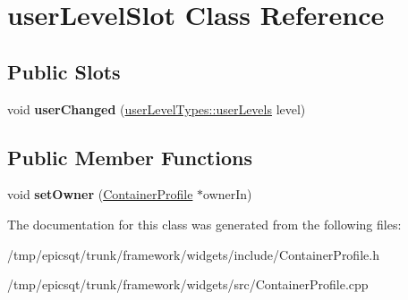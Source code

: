 \hypertarget{classuserLevelSlot}{
\section{userLevelSlot Class Reference}
\label{classuserLevelSlot}
}
\subsection*{Public Slots}
\begin{DoxyCompactItemize}
\item 
\hypertarget{classuserLevelSlot_af89803dcb509c62b15aa3c4f97d7492c}{
void {\bfseries userChanged} (\hyperlink{classuserLevelTypes_a033cf2a40f620286b1839dd360c8497b}{userLevelTypes::userLevels} level)}
\label{classuserLevelSlot_af89803dcb509c62b15aa3c4f97d7492c}

\end{DoxyCompactItemize}
\subsection*{Public Member Functions}
\begin{DoxyCompactItemize}
\item 
\hypertarget{classuserLevelSlot_ab7e30880f2d2f59f33ed03d002bb95ef}{
void {\bfseries setOwner} (\hyperlink{classContainerProfile}{ContainerProfile} $\ast$ownerIn)}
\label{classuserLevelSlot_ab7e30880f2d2f59f33ed03d002bb95ef}

\end{DoxyCompactItemize}


The documentation for this class was generated from the following files:\begin{DoxyCompactItemize}
\item 
/tmp/epicsqt/trunk/framework/widgets/include/ContainerProfile.h\item 
/tmp/epicsqt/trunk/framework/widgets/src/ContainerProfile.cpp\end{DoxyCompactItemize}
